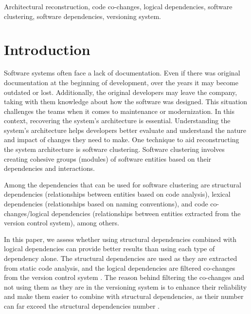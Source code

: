 \documentclass{ieeeaccess}
\begin{document}
\begin{keywords}
Architectural reconstruction, code co-changes, logical dependencies, software clustering, software dependencies, versioning system.
\end{keywords}

\titlepgskip=-21pt

\maketitle

\section{Introduction}
\label{sec:introduction}

Software systems often face a lack of documentation. Even if there was original documentation at the beginning of development, over the years it may become outdated or lost. Additionally, the original developers may leave the company, taking with them knowledge about how the software was designed. This situation challenges the teams when it comes to maintenance or modernization. In this context, recovering the system's architecture is essential. Understanding the system's architecture helps developers better evaluate and understand the nature and impact of changes they need to make. One technique to aid reconstructing the system architecture is software clustering. Software clustering involves creating cohesive groups (modules) of software entities based on their dependencies and interactions.

Among the dependencies that can be used for software clustering are structural dependencies (relationships between entities based on code analysis), lexical dependencies (relationships based on naming conventions),  and code co-changes/logical dependencies (relationships between entities extracted from the version control system), among others. 

In this paper, we assess whether using structural dependencies combined with logical dependencies can provide better results than using each type of dependency alone. The structural dependencies are used as they are extracted from static code analysis, and the logical dependencies are filtered co-changes from the version control system \cite{b15}. The reason behind filtering the co-changes and not using them as they are in the versioning system is to enhance their reliability and make them easier to combine with structural dependencies, as their number can far exceed the structural dependencies number \cite{b1}.
\end{document}
